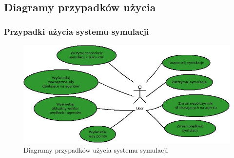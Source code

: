 \subsection{Diagramy przypadków użycia}

\subsubsection{Przypadki użycia systemu symulacji}
\begin{figure}[ht]
\centering
\includegraphics[scale=0.7]{UseCaseCalculate}
\caption{Diagramy przypadków użycia systemu symulacji}
\end{figure}


